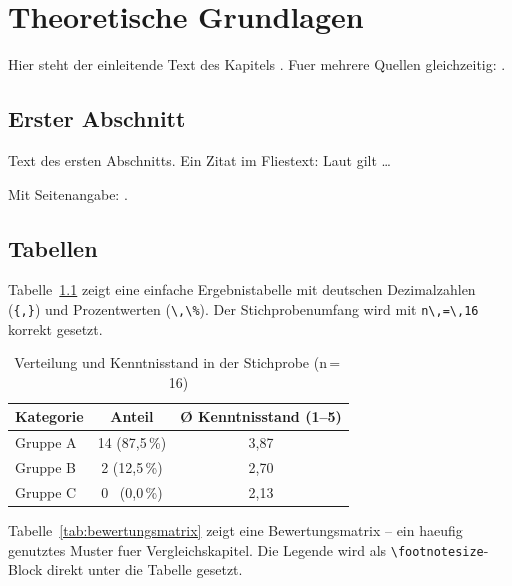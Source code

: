 
\chapter{Theoretische Grundlagen}
\label{chap:grundlagen}

Hier steht der einleitende Text des Kapitels \autocite{beispiel_buch_2020}.
Fuer mehrere Quellen gleichzeitig: \autocite{beispiel_artikel_2019, beispiel_online_2024}.

\section{Erster Abschnitt}
\label{sec:abschnitt1}

Text des ersten Abschnitts. Ein Zitat im Fliestext: Laut
\textcite{beispiel_buch_2020} gilt \ldots

Mit Seitenangabe: \autocite[S.~42]{beispiel_buch_2020}.

\section{Tabellen}
\label{sec:tabellen}

Tabelle~\ref{tab:stichprobe} zeigt eine einfache Ergebnistabelle mit
deutschen Dezimalzahlen (\texttt{\{,\}}) und Prozentwerten (\texttt{\textbackslash,\textbackslash\%}).
Der Stichprobenumfang wird mit \texttt{n\textbackslash,=\textbackslash,16} korrekt gesetzt.

\begin{table}[h]
\centering
\caption{Verteilung und Kenntnisstand in der Stichprobe (n\,=\,16)}
\label{tab:stichprobe}
\begin{tabular}{lcc}
\toprule
\textbf{Kategorie} & \textbf{Anteil} & \textbf{\O{} Kenntnisstand (1--5)} \\
\midrule
Gruppe A & 14 (87{,}5\,\%) & 3{,}87 \\
Gruppe B &  2 (12{,}5\,\%) & 2{,}70 \\
Gruppe C &  0 ~(0{,}0\,\%) & 2{,}13 \\
\bottomrule
\end{tabular}
\end{table}

Tabelle~\ref{tab:bewertungsmatrix} zeigt eine Bewertungsmatrix -- ein
haeufig genutztes Muster fuer Vergleichskapitel. Die Legende wird als
\texttt{\textbackslash footnotesize}-Block direkt unter die Tabelle gesetzt.

